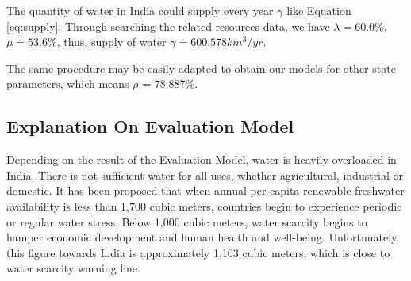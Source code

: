 \documentclass[tcn = 45538, sheet = true, abstract = true]{mcmthesis}
\begin{document}
The quantity of water in India could supply every year $\gamma$ like Equation \eqref{eq:supply}. 
Through searching the related resources data, 
we have $\lambda = 60.0\%$,  
$\mu = 53.6\%$, 
thus, supply of water $\gamma = 600.578 km^3/yr$.

The same procedure may be easily adapted to obtain our models for other state parameters,
which means $\rho$ = 78.887\%.

\subsection{Explanation On Evaluation Model}

\hspace{1.5 em} Depending on the result of the Evaluation Model, 
water is heavily overloaded in India.
There is not sufficient water for all uses, 
whether agricultural, 
industrial or domestic. 
It has been proposed that when annual per capita renewable freshwater availability is less than 1,700 cubic meters, 
countries begin to experience periodic or regular water stress. 
Below 1,000 cubic meters, 
water scarcity begins to hamper economic development and human health and well-being. 
Unfortunately, 
this figure towards India is approximately 1,103 cubic meters, 
which is close to water scarcity warning line. 
\end{document}
